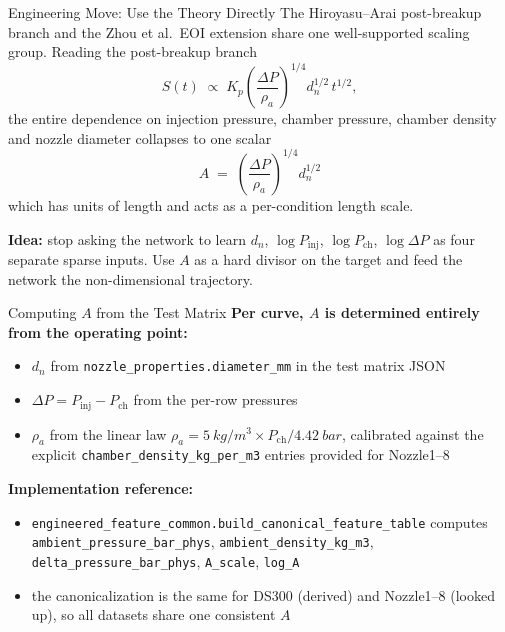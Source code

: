 \documentclass[UTF8,aspectratio=169]{ctexbeamer}
\begin{document}
\begin{frame}{Engineering Move: Use the Theory Directly}
The Hiroyasu--Arai post-breakup branch and the Zhou et al.\ EOI extension share one well-supported scaling group. Reading the post-breakup branch
\[
S(t)\;\propto\;K_p\!\left(\frac{\Delta P}{\rho_a}\right)^{1/4}d_n^{1/2}\,t^{1/2},
\]
the entire dependence on injection pressure, chamber pressure, chamber density and nozzle diameter collapses to one scalar
\[
\boxed{\;A\;=\;\left(\frac{\Delta P}{\rho_a}\right)^{1/4}d_n^{1/2}\;}
\]
which has units of length and acts as a per-condition length scale.

\vspace{0.3em}
\textbf{Idea:} stop asking the network to learn $d_n$, $\log P_{\mathrm{inj}}$, $\log P_{\mathrm{ch}}$, $\log\Delta P$ as four separate sparse inputs. Use $A$ as a hard divisor on the target and feed the network the non-dimensional trajectory.
\end{frame}

\begin{frame}{Computing $A$ from the Test Matrix}
\textbf{Per curve, $A$ is determined entirely from the operating point:}
\begin{itemize}
  \item $d_n$ from \texttt{nozzle\_properties.diameter\_mm} in the test matrix JSON
  \item $\Delta P=P_{\mathrm{inj}}-P_{\mathrm{ch}}$ from the per-row pressures
  \item $\rho_a$ from the linear law $\rho_a=\SI{5}{kg/m^3}\times P_{\mathrm{ch}}/\SI{4.42}{bar}$, calibrated against the explicit \texttt{chamber\_density\_kg\_per\_m3} entries provided for Nozzle1--8
\end{itemize}

\vspace{0.4em}
\textbf{Implementation reference:}
\begin{itemize}
  \item \texttt{engineered\_feature\_common.build\_canonical\_feature\_table} computes \texttt{ambient\_pressure\_bar\_phys}, \texttt{ambient\_density\_kg\_m3}, \texttt{delta\_pressure\_bar\_phys}, \texttt{A\_scale}, \texttt{log\_A}
  \item the canonicalization is the same for DS300 (derived) and Nozzle1--8 (looked up), so all datasets share one consistent $A$
\end{itemize}
\end{frame}
\end{document}
